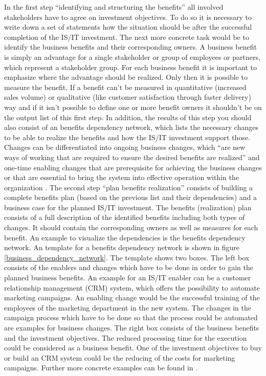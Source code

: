 In the first step ``identifying and structuring the benefits'' \citep[cf.][p.69-72]{ward_benefits_2012} all involved stakeholders have to agree on investment objectives. To do so it is necessary to write down a set of statements how the situation should be after the successful completion of the IS/IT investment. The next more concrete task would be to identify the business benefits and their corresponding owners. A business benefit is simply an advantage for a single stakeholder or group of employees or partners, which represent a stakeholder group. For each business benefit it is important to emphasize where the advantage should be realized. Only then it is possible to measure the benefit. If a benefit can't be measured in quantitative (increased sales volume) or qualitative (like customer satisfaction through faster delivery) way and if it isn't possible to define one or more benefit owners it shouldn't be on the output list of this first step. In addition, the results of this step you should also consist of an benefits dependency network, which lists the necessary changes to be able to realize the benefits and how the IS/IT investment support those. Changes can be differentiated into ongoing business changes, which ``are new ways of working that are required to ensure the desired benefits are realized'' \citep[p.72]{ward_benefits_2012} and one-time enabling changes that are prerequisite for achieving the business changes or that are essential to bring the system into effective operation within the organization \citep[p.72]{ward_benefits_2012}.
\newline\newline
The second step ``plan benefits realization'' \citep[cf.][p.75f.]{ward_benefits_2012} consists of building a complete benefits plan (based on the previous list and their dependencies) and a business case for the planned IS/IT investment. The benefits (realization) plan consists of a full description of the identified benefits including both types of changes. It should contain the corresponding owners as well as measures for each benefit. An example to visualize the dependencies is the benefits dependency network. An template for a benefits dependency network is shown in figure \ref{business_dependency_network}. The template shows two boxes. The left box consists of the enablers and changes which have to be done in order to gain the planned business benefits. An example for an IS/IT enabler can be a customer relationship management (CRM) system, which offers the possibility to automate marketing campaigns. An enabling change would be the successful training of the employees of the marketing department in the new system. The changes in the campaign process which have to be done so that the process could be automated are examples for business changes. The right box consists of the business benefits and the investment objectives. The reduced processing time for the execution could be considered as a business benefit. One of the investment objectives to buy or build an CRM system could be the reducing of the costs for marketing campaigns. Further more concrete examples can be found in \citet[p.118-123]{ward_benefits_2012}.

